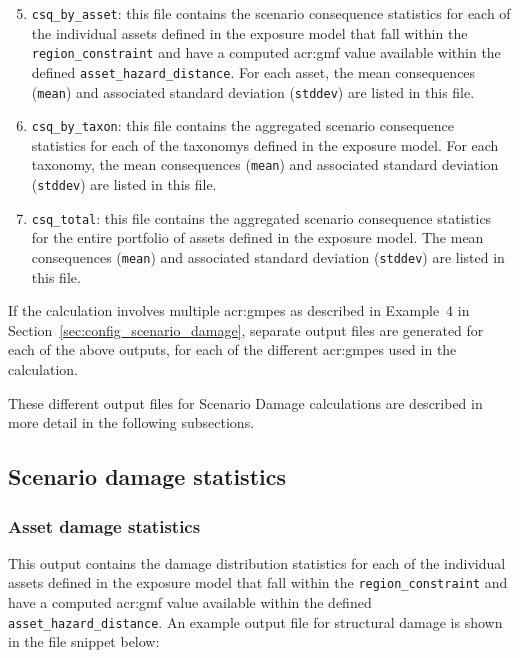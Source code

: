 \begin{enumerate}
\setcounter{enumi}{4}

  \item \Verb+csq_by_asset+: this file contains the scenario consequence
    statistics for each of the individual \glspl{asset} defined in the
    \gls{exposure model} that fall within the \Verb+region_constraint+ and have
    a computed \gls{acr:gmf} value available within the defined
    \Verb+asset_hazard_distance+. For each \gls{asset}, the mean consequences
    (\Verb+mean+) and associated standard deviation (\Verb+stddev+) are listed
    in this file.

  \item \Verb+csq_by_taxon+: this file contains the aggregated scenario
    consequence statistics for each of the \glspl{taxonomy} defined in the
    \gls{exposure model}. For each \gls{taxonomy}, the mean consequences
    (\Verb+mean+) and associated standard deviation (\Verb+stddev+) are listed
    in this file.

  \item \Verb+csq_total+: this file contains the aggregated scenario
    consequence statistics for the entire portfolio of \glspl{asset} defined
    in the \gls{exposure model}. The mean consequences (\Verb+mean+) and 
    associated standard deviation (\Verb+stddev+) are listed in this file.

\end{enumerate}

If the calculation involves multiple \glspl{acr:gmpe} as described in
Example~4 in Section~\ref{sec:config_scenario_damage}, separate output files
are generated for each of the above outputs, for each of the different
\glspl{acr:gmpe} used in the calculation.

These different output files for Scenario Damage calculations are described in
more detail in the following subsections.


\subsection{Scenario damage statistics}
\label{subsec:scenario_damage_statistics}

\subsubsection{Asset damage statistics}
\label{subsubsec:scenario_asset_damage_statistics}

This output contains the damage distribution statistics for each of the
individual \glspl{asset} defined in the \gls{exposure model} that fall within
the \Verb+region_constraint+ and have a computed \gls{acr:gmf} value available
within the defined \Verb+asset_hazard_distance+. An example output file for
structural damage is shown in the file snippet below:

